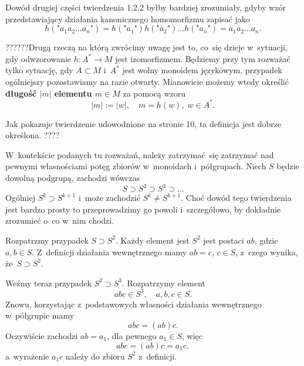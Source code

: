 \documentclass[a4paper,11pt]{article}
\begin{document}
\start {} Dowód drugiej części twierdzenia 1.2.2 byłby bardziej
zrozumiały, gdyby wzór przedstawiający działania kanonicznego homomorfizmu
zapisać jako
\begin{equation}
  \label{eq:Forys-Forys-19}
  h( \texttt{"} a_{ 1 } a_{ 2 } \ldots a_{ n } \texttt{"} ) =
  h( \texttt{"} a_{ 1 } \texttt{"} ) h( \texttt{"} a_{ 2 } \texttt{"} ) \ldots
  h( \texttt{"} a_{ n } \texttt{"} ) = a_{ 1 } a_{ 2 } \ldots a_{ n }.
\end{equation}

\vspace{\spaceFour}




??????Drugą rzeczą na którą zwrócimy uwagę jest to, co~się dzieje w~sytuacji, gdy
odwzorowanie $h : A^{ * } \to M$ jest izomorfizmem. Będziemy przy tym rozważać
tylko sytuację, gdy $A \subset M$ i~$A^{ * }$ jest wolny monoidem językowym,
przypadek ogólniejszy pozostawiamy na razie otwarty. Mianowicie możemy wtedy
określić \textbf{długość $| m |$ elementu $m \in M$} za pomocą wzoru
\begin{equation}
  \label{eq:Forys-Forys-16}
  | m | := | w |, \quad
  m = h( w ),\; w \in A^{ * }.
\end{equation}

Jak pokazuje twierdzenie udowodnione na stronie 10, ta definicja jest dobrze
określona. ????

\vspace{\spaceFour}




\start {} W~kontekście podanych tu rozważań, należy zatrzymać~się zatrzymać nad pewnymi własnościami potęg zbiorów w~monoidach i~półgrupach. Niech $S$ będzie dowolną podgrupą, zachodzi wówczas
\begin{equation}
  \label{eq:Forys-Forys-17}
  S \supset S^{ 2 } \supset S^{ 3 } \supset \ldots
\end{equation}
Ogólniej $S^{ k } \supset S^{ k + 1 }$ i~może zachodzić $S^{ k } \neq S^{ k + 1 }$. Choć dowód tego twierdzenia jest bardzo prosty to przeprowadzimy go powoli i~szczegółowo, by dokładnie zrozumieć o~co w~nim chodzi.

Rozpatrzmy przypadek $S \supset S^{ 2 }$. Każdy element jest $S^{ 2 }$ jest postaci $ab$, gdzie $a, b \in S$. Z~definicji działania wewnętrznego mamy $ab = c$, $c \in S$, z~czego wynika, że~$S \supset S^{ 2 }$.

Weźmy teraz przypadek $S^{ 2 } \supset S^{ 3 }$. Rozpatrzymy element
\begin{equation}
  \label{eq:2}
  abc \in S^{ 3 }, \quad a, b, c \in S.
\end{equation}
Znowu, korzystając z~podstawowych własności działania wewnętrznego w~półgrupie mamy
\begin{equation}
  \label{eq:3}
  abc = ( ab ) c.
\end{equation}
Oczywiście zachodzi $ab = a_{ 1 }$, dla pewnego $a_{ 1 } \in S$, więc
\begin{equation}
  \label{eq:4}
  abc = ( ab ) c = a_{ 1 } c,
\end{equation}
a~wyrażenie $a_{ 1 } c$ należy do zbioru $S^{ 2 }$ z~definicji.
\end{document}
